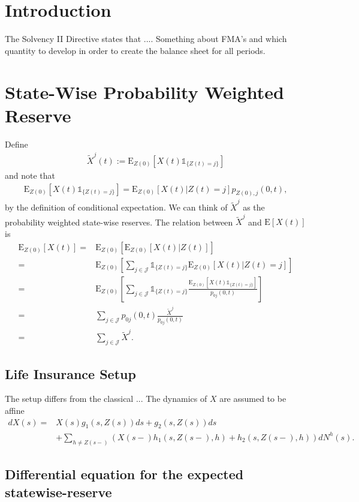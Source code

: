 \documentclass[12pt]{article}
\newcommand{\E}{\text{E}}
\newcommand{\indic}[1]{\mathds{1}_{ \{ #1 \} }}
\begin{document}
\section*{Introduction}
The Solvency II Directive states that .... Something about FMA's and which quantity to develop in order to create the balance sheet for all periods.


\section*{State-Wise Probability Weighted Reserve}
Define
\begin{align*}
\tilde{X}^j(t):=\E_{Z(0)}[X(t)\indic{Z(t)=j}]
\end{align*}
and note that
\begin{align}
\E_{Z(0)}[X(t)\indic{Z(t)=j}]= \E_{Z(0)}[X(t)|Z(t)=j]p_{Z(0),j}(0,t), \label{eq:1}
\end{align}
by the definition of conditional expectation. We can think of $\tilde{X}^j$ as the probability weighted state-wise reserves. The relation between $\tilde{X}^j$ and $\E[X(t)]$ is
\begin{align*}
\E_{Z(0)}[X(t)] =& \E_{Z(0)}[\E_{Z(0)} [ X(t)|Z(t)]] 
\\
=&
\E_{Z(0)} \left[ \sum_{j\in \mathcal{J}} \indic{Z(t)=j} \E_{Z(0)} [ X(t)|Z(t)=j] \right]
\\
=&
\E_{Z(0)} \left[ \sum_{j\in \mathcal{J}} \indic{Z(t)=j} \frac{\E_{Z(0)}[X(t)\indic{Z(t)=j}]}{p_{0j}(0,t)} \right]
\\
=&
\sum_{j\in \mathcal{J}} p_{0j}(0,t) \frac{ \tilde{X}^j}{p_{0j}(0,t)}
\\
=&
\sum_{j\in \mathcal{J}} \tilde{X}^j.
\end{align*}

\subsection*{Life Insurance Setup}
The setup differs from the classical ...
The dynamics of $X$ are assumed to be affine
\begin{align*}
dX(s)=&X(s)g_1(s,Z(s))ds+g_2(s,Z(s))ds\\
&+\sum_{h\neq Z(s-)} \left( X(s-)h_1(s,Z(s-),h)+ h_2(s,Z(s-),h)\right) dN^h(s).
\end{align*}

\subsection*{Differential equation for the expected statewise-reserve}
\end{document}
